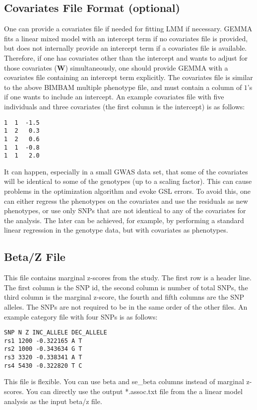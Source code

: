 \documentclass[11pt]{article}
\begin{document}
\subsection{Covariates File Format (optional)}
One can provide a covariates file if needed for fitting LMM if necessary. GEMMA fits a linear mixed model with an intercept term if no covariates file is provided, but does not internally provide an intercept term if a covariates file is available. Therefore, if one has covariates other than the intercept and wants to adjust for those covariates ($\mathbf W$) simultaneously, one should provide GEMMA with a covariates file containing an intercept term explicitly. The covariates file is similar to the above BIMBAM  multiple phenotype file, and must contain a column of $1$'s if one wants to include an intercept. An example covariates file with five individuals and three covariates (the first column is the intercept) is as follows:
%
\begin{verbatim}
1  1  -1.5
1  2   0.3
1  2   0.6
1  1  -0.8
1  1   2.0
\end{verbatim}
%
It can happen, especially in a small GWAS data set, that some of the covariates will be identical to some of the genotypes (up to a scaling factor). This can cause problems in the optimization algorithm and evoke GSL errors. To avoid this, one can either regress the phenotypes on the covariates and use the residuals as new phenotypes, or use only SNPs that are not identical to any of the covariates for the analysis. The later can be achieved, for example, by performing a standard linear regression in the genotype data, but with covariates as phenotypes.




\subsection{Beta/Z File}
This file contains marginal z-scores from the study. The first row is a header line. The first column is the SNP id, the second column is number of total SNPs, the third column is the marginal z-score, the fourth and fifth columns are the SNP alleles. The SNPs are not required to be in the same order of the other files. An example category file with four SNPs is as follows:
%
\begin{verbatim}
SNP N Z INC_ALLELE DEC_ALLELE
rs1 1200 -0.322165 A T
rs2 1000 -0.343634 G T
rs3 3320 -0.338341 A T
rs4 5430 -0.322820 T C
\end{verbatim}
%
This file is flexible. You can use beta and se\_beta columns instead of marginal z-scores. You can directly use the output *.assoc.txt file from the a linear model analysis as the input beta/z file.
\end{document}

